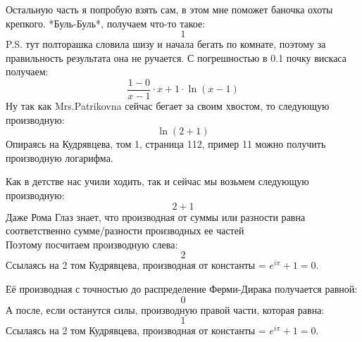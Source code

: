 \documentclass[a4paper,12pt]{article}
\begin{document}
Остальную часть я попробую взять сам, в этом мне поможет баночка охоты крепкого. *Буль-Буль*, получаем что-то такое:
\begin{equation}
1
\end{equation} 
 P.S. тут полторашка словила шизу и начала бегать по комнате, поэтому за правильность результата она не ручается. С погрешностью в 0.1 почку вискаса получаем:
\begin{equation}
\frac{1-0}{x-1}  \cdot x+1 \cdot \ln(x-1) 
\end{equation} 
Ну так как Mrs.Patrikovna сейчас бегает за своим хвостом, то следующую производную: 
\begin{equation}
\ln(2+1) 
\end{equation} 
Опираясь на Кудрявцева, том 1, страница 112, пример 11 можно получить производную логарифма.

Как в детстве нас учили ходить, так и сейчас мы возьмем следующую производную:
\begin{equation}
2+1
\end{equation} 
Даже Рома Глаз знает, что производная от суммы или разности равна соответственно сумме/разности производных ее частей\\Поэтому посчитаем производную слева: 
\begin{equation}
2
\end{equation} 
Ссылаясь на 2 том Кудрявцева, производная от константы = $e^{i\pi} + 1 = 0$.

Её производная с точностью до распределение Ферми-Дирака получается равной:
\begin{equation}
0
\end{equation} 
А после, если останутся силы, производную правой части, которая равна: 
\begin{equation}
1
\end{equation} 
Ссылаясь на 2 том Кудрявцева, производная от константы = $e^{i\pi} + 1 = 0$.
\end{document}
